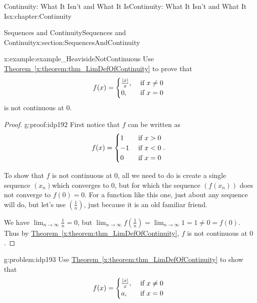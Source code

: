 \begin{chapterptx}{Continuity: What It Isn't and What It Is}{}{Continuity: What It Isn't and What It Is}{}{}{x:chapter:Continuity}
\begin{sectionptx}{Sequences and Continuity}{}{Sequences and Continuity}{}{}{x:section:SequencesAndContinuity}
		\begin{example}{}{x:example:example_HeavisideNotContinuous}%
			Use \hyperref[x:theorem:thm_LimDefOfContinuity]{Theorem~{\xreffont\ref{x:theorem:thm_LimDefOfContinuity}}} to prove that%
			\begin{equation*}
				f(x)= \begin{cases}\frac{|x|}{x}\text{,} & \text{ if } x\neq 0\\ 0\text{,} & \text{ if } x=0 \end{cases}
			\end{equation*}
			is not continuous at \(0\).%
		\end{example}
		\begin{proof}{}{g:proof:idp192}
			First notice that \(f\) can be written as%
			\begin{equation*}
				f(x)= \begin{cases}1& \text{ if } x>0\\ -1& \text{ if } x< 0\\ 0& \text{ if } x=0 \end{cases} \text{.}
			\end{equation*}
			\par
			To show that \(f\) is not continuous at \(0\), all we need to do is create a single sequence \(\left(x_n\right)\)which converges to \(0\), but for which the sequence \(\left(f\left(x_n\right)\right)\) does not converge to \(f(0)=0\).  For a function like this one, just about any sequence will do, but let's use \(\left(\frac{1}{n}\right)\), just because it is an old familiar friend.%
			\par
			We have \(\displaystyle\lim_{n\rightarrow\infty}\frac{1}{n}=0\), but \(\displaystyle\lim_{n\rightarrow\infty}f\left(\frac{1}{n}\right)=\lim_{n\rightarrow
				\infty}1=1\neq 0=f(0)\).  Thus by \hyperref[x:theorem:thm_LimDefOfContinuity]{Theorem~{\xreffont\ref{x:theorem:thm_LimDefOfContinuity}}}, \(f\) is not continuous at \(0\).%
		\end{proof}
		\begin{problem}{}{g:problem:idp193}%
			 Use \hyperref[x:theorem:thm_LimDefOfContinuity]{Theorem~{\xreffont\ref{x:theorem:thm_LimDefOfContinuity}}} to show that%
			\begin{equation*}
				f(x)= \begin{cases}
					\frac{\abs{x}}{x},\amp \text{ if } x\neq 0\\
					a, \amp \text{ if } x=0 \end{cases}  

\end{equation*}
\end{problem}
\end{sectionptx}
\end{chapterptx}
